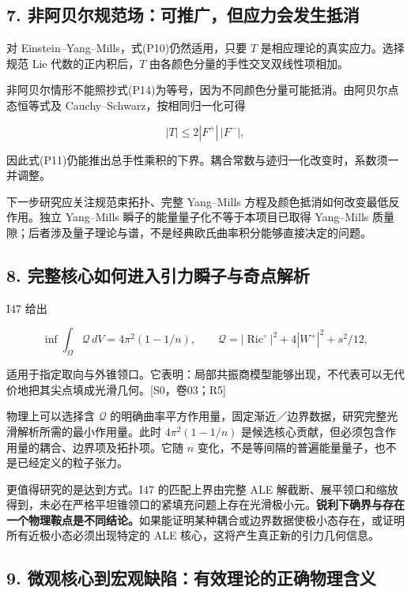 \documentclass[UTF8,a4paper,11pt,fontset=fandol]{ctexart}
\begin{document}
\subsection{7.
非阿贝尔规范场：可推广，但应力会发生抵消}\label{ux975eux963fux8d1dux5c14ux89c4ux8303ux573aux53efux63a8ux5e7fux4f46ux5e94ux529bux4f1aux53d1ux751fux62b5ux6d88}

对 Einstein--Yang--Mills，式(P10)仍然适用，只要 \(T\)
是相应理论的真实应力。选择规范 Lie 代数的正内积后，\(T\)
由各颜色分量的手性交叉双线性项相加。

非阿贝尔情形不能照抄式(P14)为等号，因为不同颜色分量可能抵消。由阿贝尔点态恒等式及
Cauchy--Schwarz，按相同归一化可得

\[
|T|\le2|F^+|\,|F^-|,
\tag{P16}
\]

因此式(P11)仍能推出总手性乘积的下界。耦合常数与迹归一化改变时，系数须一并调整。

下一步研究应关注规范束拓扑、完整 Yang--Mills
方程及颜色抵消如何改变最低反作用。独立 Yang--Mills
瞬子的能量量子化不等于本项目已取得 Yang--Mills
质量隙；后者涉及量子理论与谱，不是经典欧氏曲率积分能够直接决定的问题。

\subsection{8.
完整核心如何进入引力瞬子与奇点解析}\label{ux5b8cux6574ux6838ux5fc3ux5982ux4f55ux8fdbux5165ux5f15ux529bux77acux5b50ux4e0eux5947ux70b9ux89e3ux6790}

I47 给出

\[
\inf\int_\Omega\mathscr Q\,dV
=4\pi^2(1-1/n),\qquad
\mathscr Q=|\operatorname{Ric}^{\circ}|^2+4|W^+|^2+s^2/12,
\tag{P17}
\]

适用于指定取向与外锥领口。它表明：局部共振商模型能够出现，不代表可以无代价地把其尖点填成光滑几何。{[}S0，卷03；R5{]}

物理上可以选择含 \(\mathscr Q\)
的明确曲率平方作用量，固定渐近／边界数据，研究完整光滑解析所需的最小作用量。此时
\(4\pi^2(1-1/n)\)
是候选核心贡献，但必须包含作用量的耦合、边界项及拓扑项。它随 \(n\)
变化，不是等间隔的普遍能量量子，也不是已经定义的粒子张力。

更值得研究的是达到方式。I47 的匹配上界由完整 ALE
解截断、展平领口和缩放得到，未必在严格平坦锥领口的紧填充问题上存在光滑极小元。\textbf{锐利下确界与存在一个物理鞍点是不同结论。}如果能证明某种耦合或边界数据使极小态存在，或证明所有近极小态必须出现特定的
ALE 核心，这将产生真正新的引力几何信息。

\subsection{9.
微观核心到宏观缺陷：有效理论的正确物理含义}\label{ux5faeux89c2ux6838ux5fc3ux5230ux5b8fux89c2ux7f3aux9677ux6709ux6548ux7406ux8bbaux7684ux6b63ux786eux7269ux7406ux542bux4e49}
\end{document}
